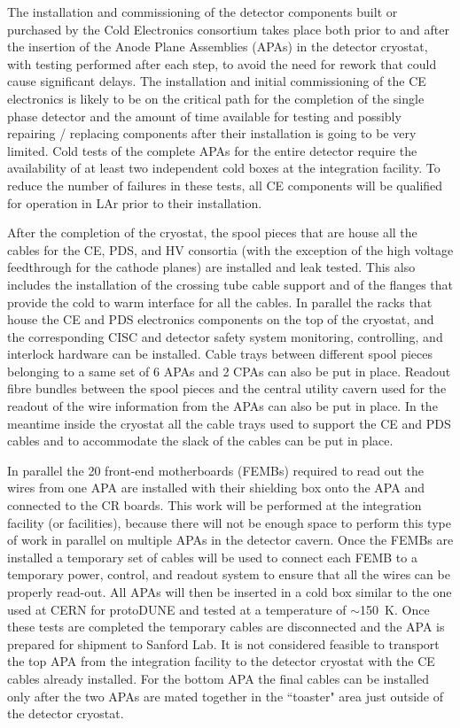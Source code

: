 The installation and commissioning of the detector components built or
purchased by the Cold Electronics consortium takes place both prior to
and after the insertion of the Anode Plane Assemblies (APAs) in the
detector cryostat, with testing performed after each step, to avoid the
need for rework that could cause significant delays. The installation and
initial commissioning of the CE electronics is likely to be on the critical
path for the completion of the single phase detector and the amount of
time available for testing and possibly repairing / replacing components
after their installation is going to be very limited. Cold tests of the complete
APAs for the entire detector require the
availability of at least two independent cold boxes at the integration facility.
To reduce the number of failures in these tests, all CE components will
be qualified for operation in LAr prior to their installation.

After the completion of the cryostat, the spool pieces that are house all the
cables for the CE, PDS, and HV consortia (with the exception of the high
voltage feedthrough for the cathode planes) are installed and leak tested.
This also includes the installation of the crossing tube cable support and of
the flanges that provide the cold to warm interface for all the cables.
In parallel the racks that house the CE and PDS electronics components on
the top of the cryostat, and the corresponding CISC and detector safety
system monitoring, controlling, and interlock hardware can be installed.
Cable trays between different spool pieces belonging to a same set of 6 APAs
and 2 CPAs can also be put in place. Readout fibre bundles between the
spool pieces and the central utility cavern used for the readout of the wire
information from the APAs can also be put in place. In the meantime inside
the cryostat all the cable trays used to support the CE and PDS cables and to
accommodate the slack of the cables can be put in place.

In parallel the 20 front-end motherboards (FEMBs) required to read out the
wires from one APA are installed with their shielding box onto the APA and
connected to the CR boards. This work will be performed at the integration
facility (or facilities), because there will not be enough space to perform
this type of work in parallel on multiple APAs in the detector cavern. Once
the FEMBs are installed a temporary set of cables will be
used to connect each FEMB to a temporary power, control, and readout system
to ensure that all the wires can be properly read-out. All APAs
will then be inserted in a cold box similar
to the one used at CERN for protoDUNE and tested at a temperature of
$\sim$150~K. Once these tests
are completed the temporary cables are disconnected and the APA is prepared
for shipment to Sanford Lab. It is not considered feasible to transport the
top APA from the integration facility to the detector cryostat with the
CE cables already installed. For the bottom APA the final cables can be
installed only after the two APAs are mated together in the ``toaster" area
just outside of the detector cryostat.

